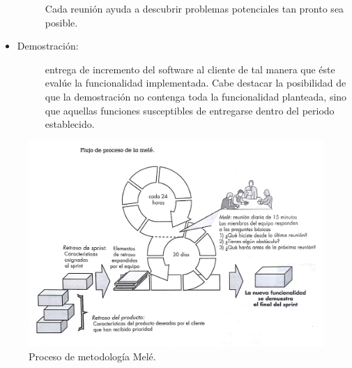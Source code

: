 \begin{itemize}
\begin{description}
                Cada reunión ayuda a descubrir problemas potenciales tan pronto sea posible.
            \end{description}

    \item   \begin{description}
                \item[Demostración:] entrega de incremento del software al cliente de tal manera que éste evalúe la funcionalidad implementada. Cabe destacar la posibilidad de que la demostración no contenga toda la funcionalidad planteada, sino que aquellas funciones susceptibles de entregarse dentro del periodo establecido.
            \end{description}
\end{itemize}

\begin{figure}[h!]
    \includegraphics[width=\textwidth]{Imagenes/mele.jpg}
    \caption{\label{fig: procesoMele} Proceso de metodología Melé.}
\end{figure}
